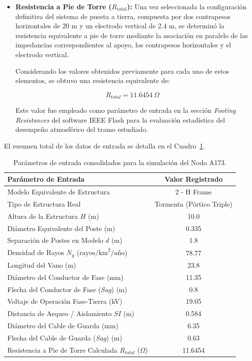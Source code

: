 \documentclass[12pt,letterpaper]{article}
\begin{document}
\begin{itemize}
	\begin{equation}
		D_{eq} = \frac{2 \times 0.26\text{ m} + 0.15\text{ m}}{2} = 0.335\text{ m}
	\end{equation}
	\item \textbf{Resistencia a Pie de Torre ($R_{total}$):} Una vez seleccionada la configuración definitiva del sistema de puesta a tierra, compuesta por dos contrapesos horizontales de 20 m y un electrodo vertical de 2.4 m, se determinó la resistencia equivalente a pie de torre mediante la asociación en paralelo de las impedancias correspondientes al apoyo, los contrapesos horizontales y el electrodo vertical.

    Considerando los valores obtenidos previamente para cada uno de estos elementos, se obtuvo una resistencia equivalente de:
    
    \begin{equation}
    R_{total}=11.6454\ \Omega
    \end{equation}
    
    Este valor fue empleado como parámetro de entrada en la sección \textit{Footing Resistances} del software IEEE Flash para la evaluación estadística del desempeño atmosférico del tramo estudiado.
\end{itemize}

El resumen total de los datos de entrada se detalla en el Cuadro~\ref{tab:parametros_flash_A173}.

\begin{table}[H]
	\centering
	\caption{Parámetros de entrada consolidados para la simulación del Nodo A173.}
	\label{tab:parametros_flash_A173}
	\begin{tabular}{lc}
		\toprule
		\textbf{Parámetro de Entrada} & \textbf{Valor Registrado} \\
		\midrule
		Modelo Equivalente de Estructura & 2 - H Frame \\
		Tipo de Estructura Real & Tormenta (Pórtico Triple) \\
		Altura de la Estructura $H$ (m) & 10.0 \\
		Diámetro Equivalente del Poste (m) & 0.335 \\
		Separación de Postes en Modelo $d$ (m) & 1.8 \\
		Densidad de Rayos $N_g$ ($\text{rayos/km}^2/\text{año}$) & 78.77 \\
		Longitud del Vano (m) & 23.8 \\
		Diámetro del Conductor de Fase (mm) & 11.35 \\
		Flecha del Conductor de Fase (\textit{Sag}) (m) & 0.8 \\
		Voltaje de Operación Fase-Tierra (kV) & 19.05 \\
		Distancia de Arqueo / Aislamiento $SI$ (m) & 0.584 \\
		Diámetro del Cable de Guarda (mm) & 6.35 \\
		Flecha del Cable de Guarda (\textit{Sag}) (m) & 0.63 \\
		Resistencia a Pie de Torre Calculada $R_{total}$ ($\Omega$) & 11.6454 \\
		\bottomrule
	\end{tabular}
\end{table}
\end{document}
